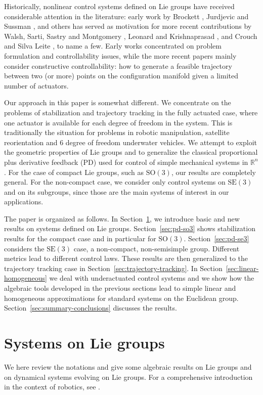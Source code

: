 \documentclass[11pt]{article}
\newcommand{\SO}{\mathrm{SO}}
\newcommand{\SE}{\mathrm{SE}}
\newcommand{\R}{\mathbb R}
\begin{document}
Historically, nonlinear control systems defined on Lie groups have received considerable attention in the literature: early work by Brockett \cite{5,7}, Jurdjevic and Sussman \cite{15}, and others has served as motivation for more recent contributions by Walsh, Sarti, Sastry and Montgomery \cite{29,32}, Leonard and Krishnaprasad \cite{20,21}, and Crouch and Silva Leite \cite{10}, to name a few. Early works concentrated on problem formulation and controllability issues, while the more recent papers mainly consider constructive controllability: how to generate a feasible trajectory between two (or more) points on the configuration manifold given a limited number of actuators.

Our approach in this paper is somewhat different. We concentrate on the problems of stabilization and trajectory tracking in the fully actuated case, where one actuator is available for each degree of freedom in the system. This is traditionally the situation for problems in robotic manipulation, satellite reorientation and 6 degree of freedom underwater vehicles. We attempt to exploit the geometric properties of Lie groups and to generalize the classical proportional plus derivative feedback (PD) used for control of simple mechanical systems in $\R^n$. For the case of compact Lie groups, such as $\SO(3)$, our results are completely general. For the non-compact case, we consider only control systems on $\SE(3)$ and on its subgroups, since those are the main systems of interest in our applications.

The paper is organized as follows. In Section~\ref{sec:systems-lie-groups}, we introduce basic and new results on systems defined on Lie groups. Section~\ref{sec:pd-so3} shows stabilization results for the compact case and in particular for $\SO(3)$. Section~\ref{sec:pd-se3} considers the $\SE(3)$ case, a non-compact, non-semisimple group. Different metrics lead to different control laws. These results are then generalized to the trajectory tracking case in Section~\ref{sec:trajectory-tracking}. In Section~\ref{sec:linear-homogeneous} we deal with underactuated control systems and we show how the algebraic tools developed in the previous sections lead to simple linear and homogeneous approximations for standard systems on the Euclidean group. Section~\ref{sec:summary-conclusions} discusses the results.

\section{Systems on Lie groups}\label{sec:systems-lie-groups}
We here review the notations and give some algebraic results on Lie groups and on dynamical systems evolving on Lie groups. For a comprehensive introduction in the context of robotics, see \cite[Appendix A]{26}.
\end{document}
